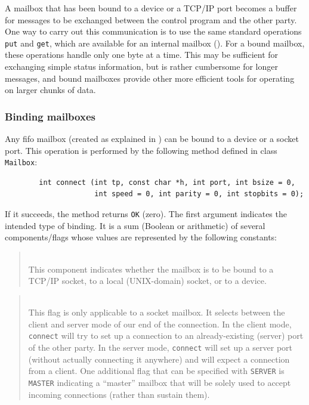 A mailbox that has been bound to a device or a TCP/IP port becomes a buffer
for messages to be exchanged between the control program and the other party.
One way to carry out this communication is to use the same standard operations
{\tt put} and {\tt get}, which are available for an internal mailbox
().
For a bound mailbox, these operations handle only one byte at a time.
This may be sufficient for exchanging simple status information,
but is rather cumbersome for longer messages, and bound mailboxes provide
other more efficient tools for operating on larger chunks of data.

\subsubsection{Binding mailboxes}
\label{rm_mb_bo_bi}

Any fifo mailbox (created as explained in )
can be bound to a device or a socket port.
This operation is performed by the following method defined in class
{\tt Mailbox}:
\begin{verbatim}
        int connect (int tp, const char *h, int port, int bsize = 0,
                     int speed = 0, int parity = 0, int stopbits = 0);
\end{verbatim}
If it succeeds, the method returns {\tt OK} (zero).
The first argument indicates the intended type of binding.
It is a sum (Boolean or arithmetic) of several components/flags
whose values are represented by the following constants:

\medskip

\begin{quote}
\noindent{}\\ \hspace{0in}
This component indicates whether the mailbox is to be bound to a
TCP/IP socket, to a local (UNIX-domain) socket,
or to a device.
\end{quote}

\begin{quote}
\noindent{}\\ \hspace{0in}
This flag is only applicable to a socket mailbox.
It selects between the client and server mode of our end of the
connection.
In the client mode, {\tt connect} will try to set up a connection to an
already-existing (server) port of the other party.
In the server mode, {\tt connect} will set up a server port (without
actually connecting it anywhere) and will expect a connection from a client.
One additional flag that can be specified with {\tt SERVER} is {\tt MASTER}
indicating a ``master'' mailbox that will be solely used to
accept incoming connections (rather than sustain them).
\end{quote}

